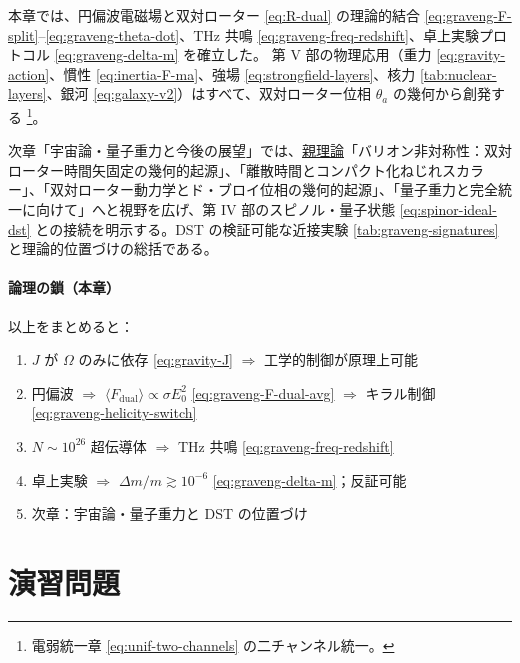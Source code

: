 \documentclass[dvipdfmx,a4paper,oneside]{jsbook}
\numberwithin{equation}{chapter}
\begin{document}
本章では、円偏波電磁場と双対ローター \eqref{eq:R-dual} の理論的結合 \eqref{eq:graveng-F-split}–\eqref{eq:graveng-theta-dot}、THz 共鳴 \eqref{eq:graveng-freq-redshift}、卓上実験プロトコル \eqref{eq:graveng-delta-m} を確立した。
第 V 部の物理応用（重力 \eqref{eq:gravity-action}、慣性 \eqref{eq:inertia-F-ma}、強場 \eqref{eq:strongfield-layers}、核力 \eqref{tab:nuclear-layers}、銀河 \eqref{eq:galaxy-v2}）はすべて、双対ローター位相 \(\theta_a\) の幾何から創発する \footnote{電弱統一章 \eqref{eq:unif-two-channels} の二チャンネル統一。}。

次章「宇宙論・量子重力と今後の展望」では、\hyperref[sec:sister-manuscripts]{親理論}「バリオン非対称性：双対ローター時間矢固定の幾何的起源」、「離散時間とコンパクト化ねじれスカラー」、「双対ローター動力学とド・ブロイ位相の幾何的起源」、「量子重力と完全統一に向けて」へと視野を広げ、第 IV 部のスピノル・量子状態 \eqref{eq:spinor-ideal-dst} との接続を明示する。DST の検証可能な近接実験 \eqref{tab:graveng-signatures} と理論的位置づけの総括である。

\paragraph{論理の鎖（本章）}
以上をまとめると：
\begin{enumerate}[leftmargin=2em]
  \item \(J\) が \(\Omega\) のみに依存 \eqref{eq:gravity-J} \(\Rightarrow\) 工学的制御が原理上可能
  \item 円偏波 \(\Rightarrow\) \(\langle F_{\mathrm{dual}}\rangle \propto \sigma E_0^2\) \eqref{eq:graveng-F-dual-avg} \(\Rightarrow\) キラル制御 \eqref{eq:graveng-helicity-switch}
  \item \(N \sim 10^{26}\) 超伝導体 \(\Rightarrow\) THz 共鳴 \eqref{eq:graveng-freq-redshift}
  \item 卓上実験 \(\Rightarrow\) \(\Delta m/m \gtrsim 10^{-6}\) \eqref{eq:graveng-delta-m}；反証可能
  \item 次章：宇宙論・量子重力と DST の位置づけ
\end{enumerate}

\section*{演習問題}
\end{document}
